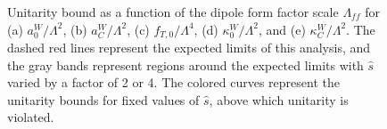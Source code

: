 \begin{figure}[hb]
\begin{center}
{  }
    \caption{ Unitarity bound as a function of the dipole form factor
scale $\Lambda_{ff}$ for (a) $a_{0}^{W}/\Lambda^{2}$, (b)
$a_{C}^{W}/\Lambda^{2}$, (c) $f_{T,0}/\Lambda^{4}$, (d)
$\kappa_{0}^{W}/\Lambda^{2}$, and (e) $\kappa_{C}^{W}/\Lambda^{2}$.
The dashed red lines represent the expected limits of this analysis,
and the gray bands represent regions around the expected limits with
$\hat{s}$ varied by a factor of 2 or 4. The colored curves represent
the unitarity bounds for fixed values of $\hat{s}$, above which
unitarity is violated.}
    \label{fig:unitarity}
  \end{center} \end{figure}

